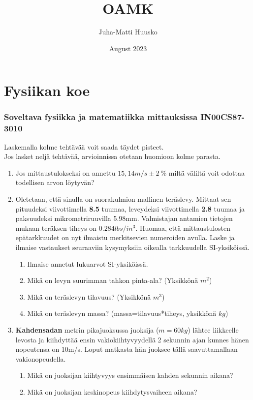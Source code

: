 \documentclass[12pt]{article}
\title{OAMK}
\author{Juha-Matti Huusko}
\date{August 2023}
\begin{document}
\thispagestyle{empty}

\section*{Fysiikan koe}
\subsubsection*{Soveltava fysiikka ja matematiikka mittauksissa IN00CS87-3010}

Laskemalla kolme tehtävää voit saada täydet pisteet.\\ Jos lasket neljä tehtävää, arvioinnissa otetaan huomioon kolme parasta.

\begin{enumerate}
\item Jos mittaustulokseksi on annettu $15,14m/s\pm 2~\%$ miltä väliltä voit odottaa todellisen arvon löytyvän?
\item Oletetaan, että sinulla on suorakulmion mallinen teräslevy. Mittaat sen pituudeksi viivottimella \textbf{8.5} tuumaa, leveydeksi viivottimella \textbf{2.8} tuumaa ja paksuudeksi mikrometriruuvilla 5.98mm. Valmistajan antamien tietojen mukaan teräksen tiheys on  $0.284 lbs/in^3$. Huomaa, että mittaustulosten epätarkkuudet on nyt ilmaistu merkitsevien numeroiden avulla. Laske ja ilmaise vastaukset seuraaviin kysymyksiin oikealla tarkkuudella SI-yksiköissä.
\begin{enumerate}
\item Ilmaise annetut lukuarvot SI-yksiköissä.
\item Mikä on levyn suurimman tahkon pinta-ala? (Yksikkönä $m^2$)
\item Mikä on teräslevyn tilavuus? (Yksikkönä $m^3$)
\item Mikä on teräslevyn massa?
(massa=tilavuus*tiheys, yksikkönä $kg$)
\end{enumerate}
\item \textbf{Kahdensadan} metrin pikajuoksussa juoksija ($m=60kg$) lähtee liikkeelle levosta ja kiihdyttää ensin vakiokiihtyvyydellä 2 sekunnin ajan kunnes hänen nopeutensa on 10m/s. Loput matkasta hän juoksee tällä saavuttamallaan vakionopeudella.
\begin{enumerate}
\item Mikä on juoksijan kiihtyvyys ensimmäisen kahden sekunnin aikana?
\item Mikä on juoksijan keskinopeus kiihdytysvaiheen aikana?

\end{enumerate}
\end{enumerate}
\end{document}
